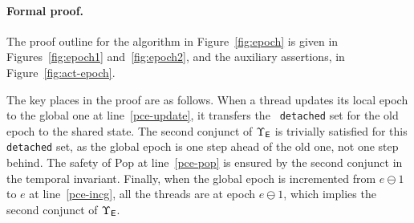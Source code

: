 \paragraph{Formal proof.}
The proof outline for the algorithm in Figure~\ref{fig:epoch} is given in
Figures~\ref{fig:epoch1} and~\ref{fig:epoch2}, and the auxiliary assertions, in
Figure~\ref{fig:act-epoch}. 

The key places in the proof are as follows. When a thread updates its local
epoch to the global one at line~\ref{pce-update}, it transfers the {\tt
  detached} set for the old epoch to the shared state. The second conjunct of
$\Upsilon_{\sf E}$ is trivially satisfied for this {\tt detached} set, as the
global epoch is one step ahead of the old one, not one step behind.  The safety
of {\sf Pop} at line~\ref{pce-pop} is ensured by the second conjunct in the
temporal invariant. Finally, when the global epoch is incremented from $e\ominus
1$ to $e$ at line~\ref{pce-incg}, all the threads are at epoch $e\ominus 1$,
which implies the second conjunct of $\Upsilon_{\sf E}$.








